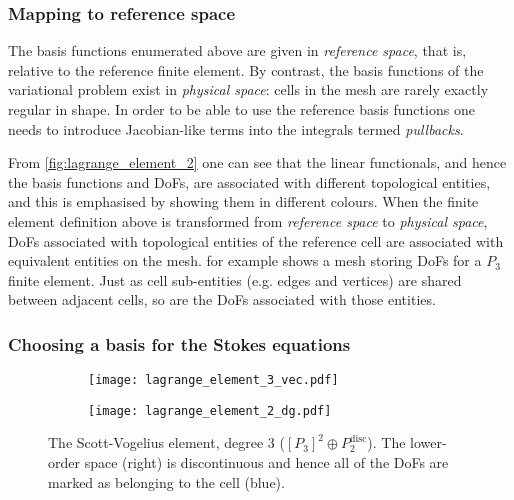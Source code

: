 \documentclass[thesis]{subfiles}
\begin{document}
\subsubsection{Mapping to reference space}


The basis functions enumerated above are given in \textit{reference space}, that is, relative to the reference finite element.
By contrast, the basis functions of the variational problem exist in \textit{physical space}: cells in the mesh are rarely exactly regular in shape.
In order to be able to use the reference basis functions one needs to introduce Jacobian-like terms into the integrals termed \textit{pullbacks}.

From \cref{fig:lagrange_element_2} one can see that the linear functionals, and hence the basis functions and DoFs, are associated with different topological entities, and this is emphasised by showing them in different colours.
When the finite element definition above is transformed from \textit{reference space} to \textit{physical space}, DoFs associated with topological entities of the reference cell are associated with equivalent entities on the mesh.
 for example shows a mesh storing DoFs for a $P_3$ finite element.
Just as cell sub-entities (e.g. edges and vertices) are shared between adjacent cells, so are the DoFs associated with those entities.

\subsubsection{Choosing a basis for the Stokes equations}

\begin{figure}
  \centering
  \begin{subfigure}{.35\textwidth}
    \centering
    \texttt{[image: lagrange\_element\_3\_vec.pdf]}
    \label{fig:scott_vogelius_element_P3}
  \end{subfigure}
  \begin{subfigure}{.35\textwidth}
    \centering
    \texttt{[image: lagrange\_element\_2\_dg.pdf]}
  \end{subfigure}
  \caption{
    The Scott-Vogelius element, degree 3 ($[P_3]^2 \oplus P_2^\mathrm{disc}$).
    The lower-order space (right) is discontinuous and hence all of the DoFs are marked as belonging to the cell (blue).
  }
  \label{fig:scott_vogelius_element}
\end{figure}
\end{document}
